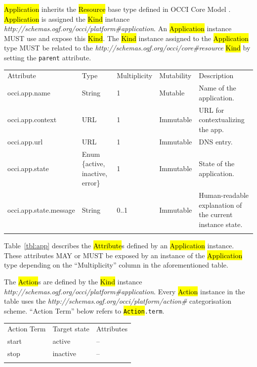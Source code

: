 \documentclass[10pt,a4paper]{article}
\begin{document}
\hl{Application} inherits the \hl{Resource} base type defined in OCCI Core Model \cite{occi:core}. \hl{Application} is assigned the \hl{Kind} instance \textit{http://schemas.ogf.org/occi/platform\#application}. An \hl{Application} instance MUST use and expose this \hl{Kind}. The \hl{Kind} instance assigned to the \hl{Application} type MUST be related to the \textit{http://schemas.ogf.org/occi/core\#resource} \hl{Kind} by setting the \texttt{parent} attribute.

{
	\begin{tabular}{lp{2.5cm}p{1cm}lp{5cm}}
	\toprule
	Attribute&Type&Multi\-plicity&Mutability&Description\\
	\colrule
	occi.app.name & String & 1 & Mutable & Name of the application.\\
	occi.app.context & URL & 1 & Immutable & URL for contextualizing the app.\\
	occi.app.url & URL & 1 & Immutable & DNS entry.\\
	occi.app.state & Enum \{active, inactive, error\} & 1 & Immutable & State of the application.\\
	occi.app.state.message & String & 0..1 & Immutable & Human-readable explanation of the current instance state.\\
	\botrule
	\end{tabular}
}

Table~\ref{tbl:app} describes the \hl{Attribute}s defined by an \hl{Application} instance. These attributes MAY or MUST be exposed by an instance of the \hl{Application} type depending on the ``Multiplicity'' column in the aforementioned table.

The \hl{Action}s are defined by the \hl{Kind} instance \textit{http://schemas.ogf.org/occi/platform\#application}. Every \hl{Action} instance in the table uses the \textit{http://schemas.ogf.org/occi/platform/action\#} categorisation scheme. ``Action Term'' below refers to \texttt{\hl{Action}.term}.

{
	\begin{tabular}{lll}
	\toprule
	Action Term & Target state & Attributes \\
	\colrule
	start & active & -- \\
	stop & inactive & -- \\
	\botrule
	\end{tabular}
}
\end{document}
